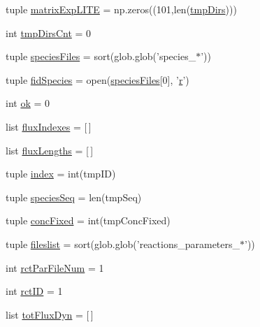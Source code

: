 \begin{DoxyCompactItemize}
\item 
tuple \hyperlink{namespacebuffered_flux_analysis_a75957649a19f5d8fc03e06de4e0e30b4}{matrix\-Exp\-L\-I\-T\-E} = np.\-zeros((101,len(\hyperlink{namespacebuffered_flux_analysis_afaa1b171179d99fee6ead2ae14dc8fc6}{tmp\-Dirs})))
\item 
int \hyperlink{namespacebuffered_flux_analysis_ab845ee953d29af3dfb8e8e1c0739b760}{tmp\-Dirs\-Cnt} = 0
\item 
tuple \hyperlink{namespacebuffered_flux_analysis_a898dbb3abbe3e409d2ee83d4a5362d6b}{species\-Files} = sort(glob.\-glob('species\-\_\-$\ast$'))
\item 
tuple \hyperlink{namespacebuffered_flux_analysis_a56ea4478f0de4eca040d22421819e250}{fid\-Species} = open(\hyperlink{namespacebuffered_flux_analysis_a898dbb3abbe3e409d2ee83d4a5362d6b}{species\-Files}\mbox{[}0\mbox{]}, '\hyperlink{_k_s_search_launcher_8m_ac862e7284527eb913b1351c8bfb8e079}{r}')
\item 
int \hyperlink{namespacebuffered_flux_analysis_a2ca9e7b06751f98dec759e29fb4e0ff1}{ok} = 0
\item 
list \hyperlink{namespacebuffered_flux_analysis_ae24a834136795f8237a6833f27b1d101}{flux\-Indexes} = \mbox{[}$\,$\mbox{]}
\item 
list \hyperlink{namespacebuffered_flux_analysis_ad325fa6a88238fd68ab3877253a8bfbb}{flux\-Lengths} = \mbox{[}$\,$\mbox{]}
\item 
tuple \hyperlink{namespacebuffered_flux_analysis_af7658ba15697dfeb9cd4bff8a57c7360}{index} = int(tmp\-I\-D)
\item 
tuple \hyperlink{namespacebuffered_flux_analysis_a19a0d4fb7445508e6204894b5f4eca23}{species\-Seq} = len(tmp\-Seq)
\item 
tuple \hyperlink{namespacebuffered_flux_analysis_a532dc433988bcc35543c129c92aa9e53}{conc\-Fixed} = int(tmp\-Conc\-Fixed)
\item 
tuple \hyperlink{namespacebuffered_flux_analysis_a0d1da0381917a4cdca814e4d430ff367}{fileslist} = sort(glob.\-glob('reactions\-\_\-parameters\-\_\-$\ast$'))
\item 
int \hyperlink{namespacebuffered_flux_analysis_aa203d8968b82cc631fffe3da7c46ddfd}{rct\-Par\-File\-Num} = 1
\item 
int \hyperlink{namespacebuffered_flux_analysis_ac7b9057f347140dc5ffb27b86665b372}{rct\-I\-D} = 1
\item 
list \hyperlink{namespacebuffered_flux_analysis_a8f99b100d2f8191100ee93d633cb7a62}{tot\-Flux\-Dyn} = \mbox{[}$\,$\mbox{]}
\item 

\end{DoxyCompactItemize}
